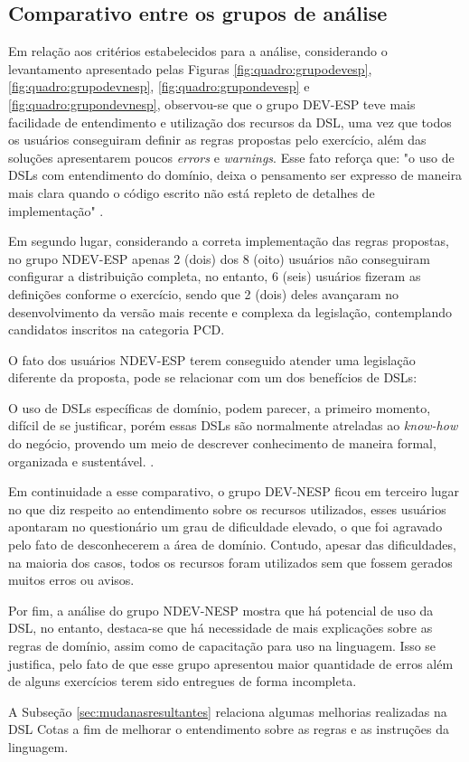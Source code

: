 \subsection{Comparativo entre os grupos de análise}
\label{sec:comparativogrupos}

Em relação aos critérios estabelecidos para a análise, considerando o levantamento apresentado pelas Figuras \ref{fig:quadro:grupodevesp}, \ref{fig:quadro:grupodevnesp}, \ref{fig:quadro:grupondevesp} e \ref{fig:quadro:grupondevnesp}, observou-se que o grupo DEV-ESP teve mais facilidade de entendimento e utilização dos recursos da DSL, uma vez que todos os usuários conseguiram definir as regras propostas pelo exercício, além das soluções apresentarem poucos \textit{errors} e \textit{warnings}. Esse fato reforça que: "o uso de DSLs com entendimento do domínio, deixa o pensamento ser expresso de maneira mais clara quando o código escrito não está repleto de detalhes de implementação"  \cite[p.41, tradução nossa]{dslengineering}.

Em segundo lugar, considerando a correta implementação das regras propostas, no grupo NDEV-ESP apenas 2 (dois) dos 8 (oito) usuários não conseguiram configurar a distribuição completa, no entanto, 6 (seis) usuários fizeram as definições conforme o exercício, sendo que 2 (dois) deles avançaram no desenvolvimento da versão mais recente e complexa da legislação, contemplando candidatos inscritos na categoria PCD. 

O fato dos usuários NDEV-ESP terem conseguido atender uma legislação diferente da proposta, pode se relacionar com um dos benefícios de DSLs: 

\begin{citacao}
O uso de DSLs específicas de domínio, podem parecer, a primeiro momento, difícil de se justificar, porém essas DSLs são normalmente atreladas ao \textit{know-how} do negócio, provendo um meio de descrever conhecimento de maneira formal, organizada e sustentável. \cite[p.43, tradução nossa]{dslengineering}.
\end{citacao}

Em continuidade a esse comparativo, o grupo DEV-NESP ficou em terceiro lugar no que diz respeito ao entendimento sobre os recursos utilizados, esses usuários apontaram no questionário um grau de dificuldade elevado, o que foi agravado pelo fato de desconhecerem a área de domínio. Contudo, apesar das dificuldades, na maioria dos casos, todos os recursos foram utilizados sem que fossem gerados muitos erros ou avisos. 

Por fim, a análise do grupo NDEV-NESP mostra que há potencial de uso da DSL, no entanto, destaca-se que há necessidade de mais explicações sobre as regras de domínio, assim como de capacitação para uso na linguagem. Isso se justifica, pelo fato de que esse grupo apresentou maior quantidade de erros além de alguns exercícios terem sido entregues de forma incompleta. 

A Subseção \ref{sec:mudanasresultantes} relaciona algumas melhorias realizadas na DSL Cotas a fim de melhorar o entendimento sobre as regras e as instruções da linguagem.

